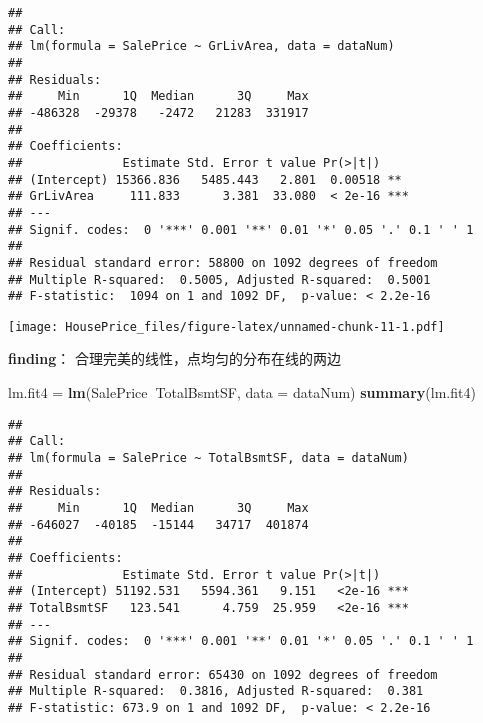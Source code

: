 \documentclass[]{article}
\newenvironment{Shaded}{\begin{snugshade}}{\end{snugshade}}
\newcommand{\KeywordTok}[1]{\textcolor[rgb]{0.13,0.29,0.53}{\textbf{#1}}}
\newcommand{\DataTypeTok}[1]{\textcolor[rgb]{0.13,0.29,0.53}{#1}}
\newcommand{\DecValTok}[1]{\textcolor[rgb]{0.00,0.00,0.81}{#1}}
\newcommand{\StringTok}[1]{\textcolor[rgb]{0.31,0.60,0.02}{#1}}
\newcommand{\OperatorTok}[1]{\textcolor[rgb]{0.81,0.36,0.00}{\textbf{#1}}}
\newcommand{\NormalTok}[1]{#1}
\begin{document}
\begin{verbatim}
## 
## Call:
## lm(formula = SalePrice ~ GrLivArea, data = dataNum)
## 
## Residuals:
##     Min      1Q  Median      3Q     Max 
## -486328  -29378   -2472   21283  331917 
## 
## Coefficients:
##              Estimate Std. Error t value Pr(>|t|)    
## (Intercept) 15366.836   5485.443   2.801  0.00518 ** 
## GrLivArea     111.833      3.381  33.080  < 2e-16 ***
## ---
## Signif. codes:  0 '***' 0.001 '**' 0.01 '*' 0.05 '.' 0.1 ' ' 1
## 
## Residual standard error: 58800 on 1092 degrees of freedom
## Multiple R-squared:  0.5005, Adjusted R-squared:  0.5001 
## F-statistic:  1094 on 1 and 1092 DF,  p-value: < 2.2e-16
\end{verbatim}

\begin{Shaded}
\end{Shaded}

\texttt{[image: HousePrice\_files/figure-latex/unnamed-chunk-11-1.pdf]}

\textbf{finding}： 合理完美的线性，点均匀的分布在线的两边

\begin{Shaded}
\begin{Highlighting}[]
\NormalTok{lm.fit4 =}\StringTok{ }\KeywordTok{lm}\NormalTok{(SalePrice}\OperatorTok{~}\NormalTok{TotalBsmtSF, }\DataTypeTok{data =}\NormalTok{ dataNum)}
\KeywordTok{summary}\NormalTok{(lm.fit4)}
\end{Highlighting}
\end{Shaded}

\begin{verbatim}
## 
## Call:
## lm(formula = SalePrice ~ TotalBsmtSF, data = dataNum)
## 
## Residuals:
##     Min      1Q  Median      3Q     Max 
## -646027  -40185  -15144   34717  401874 
## 
## Coefficients:
##              Estimate Std. Error t value Pr(>|t|)    
## (Intercept) 51192.531   5594.361   9.151   <2e-16 ***
## TotalBsmtSF   123.541      4.759  25.959   <2e-16 ***
## ---
## Signif. codes:  0 '***' 0.001 '**' 0.01 '*' 0.05 '.' 0.1 ' ' 1
## 
## Residual standard error: 65430 on 1092 degrees of freedom
## Multiple R-squared:  0.3816, Adjusted R-squared:  0.381 
## F-statistic: 673.9 on 1 and 1092 DF,  p-value: < 2.2e-16
\end{verbatim}
\end{document}

